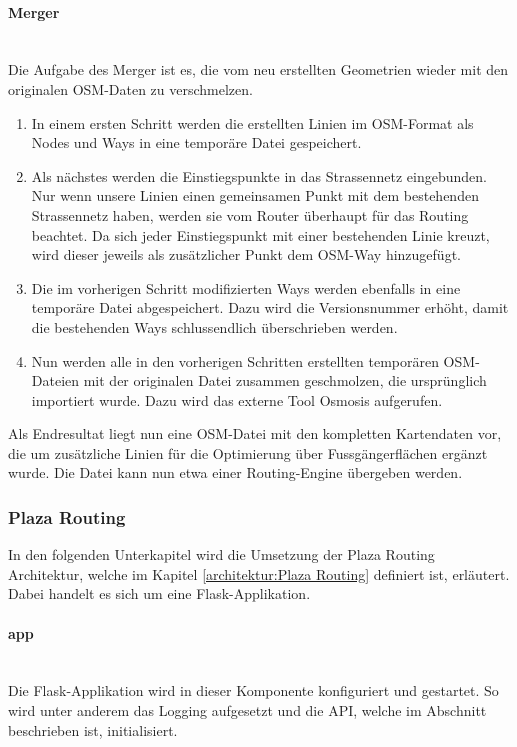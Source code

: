 \paragraph{Merger}\label{impl:Merger}~\\
Die Aufgabe des Merger ist es, die vom  neu erstellten Geometrien wieder mit den originalen \ac{OSM}-Daten zu verschmelzen.
\begin{enumerate}
    \item In einem ersten Schritt werden die erstellten Linien im \ac{OSM}-Format als Nodes und Ways in eine temporäre Datei gespeichert.
    \item Als nächstes werden die Einstiegspunkte in das Strassennetz eingebunden. Nur wenn unsere Linien einen gemeinsamen Punkt mit dem bestehenden Strassennetz haben, werden sie vom Router überhaupt für das Routing beachtet. Da sich jeder Einstiegspunkt mit einer bestehenden Linie kreuzt, wird dieser jeweils als zusätzlicher Punkt dem \ac{OSM}-Way hinzugefügt.
    \item Die im vorherigen Schritt modifizierten Ways werden ebenfalls in eine temporäre Datei abgespeichert. Dazu wird die Versionsnummer erhöht, damit die bestehenden Ways schlussendlich überschrieben werden.
    \item Nun werden alle in den vorherigen Schritten erstellten temporären \ac{OSM}-Dateien mit der originalen Datei zusammen geschmolzen, die ursprünglich importiert wurde. Dazu wird das externe Tool Osmosis \cite{osmosis} aufgerufen.
\end{enumerate}

Als Endresultat liegt nun eine \ac{OSM}-Datei mit den kompletten Kartendaten vor, die um zusätzliche Linien für die Optimierung über Fussgängerflächen ergänzt wurde. Die Datei kann nun etwa einer Routing-Engine übergeben werden.

\subsubsection{Plaza Routing}
\label{impl:Plaza Routing}
In den folgenden Unterkapitel wird die Umsetzung der Plaza Routing Architektur, welche im Kapitel \ref{architektur:Plaza Routing} definiert ist, erläutert. Dabei handelt es sich um eine Flask-Applikation\cite{flask}.

\paragraph{app}\label{impl:app-layer}~\\
Die Flask-Applikation\cite{flask} wird in dieser Komponente konfiguriert und gestartet. So wird unter anderem das Logging aufgesetzt und die \ac{API}, welche im Abschnitt  beschrieben ist, initialisiert.

